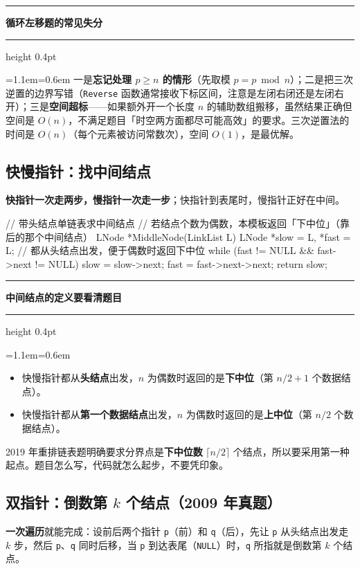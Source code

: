 \documentclass[11pt,openany,UTF8]{ctexbook}
\newcommand{\callouthead}[2]{%
  \par\addvspace{7pt}\noindent
  {\color{#1}\rule[-0.15em]{3pt}{1.05em}}\hspace{0.5em}%
  {\bfseries\color{#1}#2}\par\nobreak\vspace{-0.35em}%
  {\color{rulesep}\hrule height 0.4pt}\nobreak\vspace{0.45em}%
  \begingroup\small\setlength{\parindent}{0pt}%
  \leftskip=1.1em\rightskip=0.6em\noindent\ignorespaces}
\newcommand{\calloutend}{\par\endgroup\addvspace{7pt}}
\newenvironment{callwarn}[1]{\callouthead{warnbar}{#1}}{\calloutend}
\begin{document}
\begin{callwarn}{循环左移题的常见失分}
一是\textbf{忘记处理 $p \ge n$ 的情形}（先取模 $p = p \bmod n$）；二是把三次逆置的边界写错（\texttt{Reverse} 函数通常接收下标区间，注意是左闭右闭还是左闭右开）；三是\textbf{空间超标}——如果额外开一个长度 $n$ 的辅助数组搬移，虽然结果正确但空间是 $O(n)$，不满足题目「时空两方面都尽可能高效」的要求。三次逆置法的时间是 $O(n)$（每个元素被访问常数次），空间 $O(1)$，是最优解。

\end{callwarn}

\subsection{快慢指针：找中间结点}

\textbf{快指针一次走两步，慢指针一次走一步}；快指针到表尾时，慢指针正好在中间。

\begin{codebox}
// 带头结点单链表求中间结点
// 若结点个数为偶数，本模板返回「下中位」（靠后的那个中间结点）
LNode *MiddleNode(LinkList L) {
    LNode *slow = L, *fast = L;      // 都从头结点出发，便于偶数时返回下中位
    while (fast != NULL && fast->next != NULL) {
        slow = slow->next;
        fast = fast->next->next;
    }
    return slow;
}
\end{codebox}

\begin{callwarn}{中间结点的定义要看清题目}
\begin{itemize}
\item 快慢指针都从\textbf{头结点}出发，$n$ 为偶数时返回的是\textbf{下中位}（第 $n/2 + 1$ 个数据结点）。
\item 快慢指针都从\textbf{第一个数据结点}出发，$n$ 为偶数时返回的是\textbf{上中位}（第 $n/2$ 个数据结点）。
\end{itemize}
2019 年重排链表题明确要求分界点是\textbf{下中位数} $\lceil n/2 \rceil$ 个结点，所以要采用第一种起点。题目怎么写，代码就怎么起步，不要凭印象。

\end{callwarn}

\subsection{双指针：倒数第 $k$ 个结点（2009 年真题）}

\textbf{一次遍历}就能完成：设前后两个指针 \texttt{p}（前）和 \texttt{q}（后），先让 \texttt{p} 从头结点出发走 $k$ 步，然后 \texttt{p}、\texttt{q} 同时后移，当 \texttt{p} 到达表尾（\texttt{NULL}）时，\texttt{q} 所指就是倒数第 $k$ 个结点。
\end{document}
